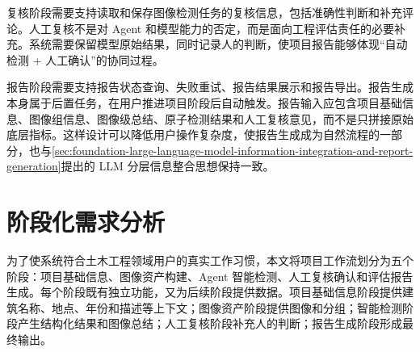 复核阶段需要支持读取和保存图像检测任务的复核信息，包括准确性判断和补充评论。人工复核不是对 Agent 和模型能力的否定，而是面向工程评估责任的必要补充。系统需要保留模型原始结果，同时记录人的判断，使项目报告能够体现“自动检测 + 人工确认”的协同过程。

报告阶段需要支持报告状态查询、失败重试、报告结果展示和报告导出。报告生成本身属于后置任务，在用户推进项目阶段后自动触发。报告输入应包含项目基础信息、图像组信息、图像级总结、原子检测结果和人工复核意见，而不是只拼接原始底层指标。这样设计可以降低用户操作复杂度，使报告生成成为自然流程的一部分，也与\cref{sec:foundation-large-language-model-information-integration-and-report-generation}提出的 LLM 分层信息整合思想保持一致。

\section{阶段化需求分析}
\label{sec:requirements-staged-requirement-analysis}

为了使系统符合土木工程领域用户的真实工作习惯，本文将项目工作流划分为五个阶段：项目基础信息、图像资产构建、Agent 智能检测、人工复核确认和评估报告生成。每个阶段既有独立功能，又为后续阶段提供数据。项目基础信息阶段提供建筑名称、地点、年份和描述等上下文；图像资产阶段提供图像和分组；智能检测阶段产生结构化结果和图像总结；人工复核阶段补充人的判断；报告生成阶段形成最终输出。


